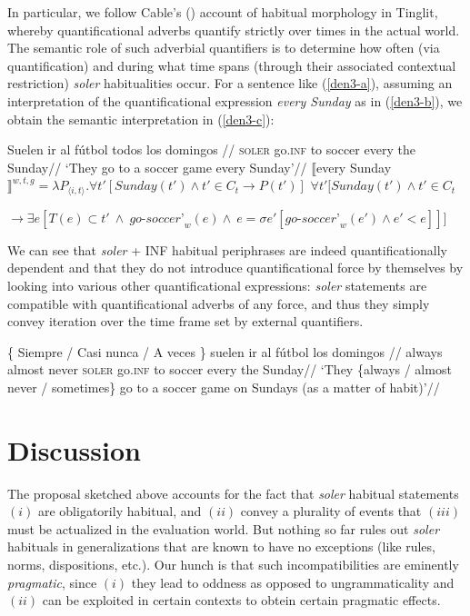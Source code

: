 \documentclass{cascadilla-xelatex-biblatex}
\begin{document}
	In particular, we follow Cable's (\cite{Cable:2022}) account of habitual morphology in Tinglit, whereby quantificational adverbs quantify strictly over times in the actual world. The semantic role of such adverbial quantifiers is to determine how often (via quantification) and during what time spans (through their associated contextual restriction) \textit{soler} habitualities occur. For a sentence like (\ref{den3-a}), assuming an interpretation of the quantificational expression \textit{every Sunday} as in (\ref{den3-b}), we obtain the semantic interpretation in (\ref{den3-c}):
	
	\pex\label{den3}
	\a\label{den3-a}\begingl
	\gla Suelen ir al f{\'u}tbol todos los domingos   //
	\glb \textsc{soler} go.\textsc{inf} to soccer every the Sunday//
	\glft `They go to a soccer game every Sunday'//
	\endgl
	\a\label{den3-b}$\llbracket$every Sunday$\rrbracket^{w,t,g} = \lambda P_{\langle i,t\rangle} . \forall t' [\textit{Sunday}(t') \wedge t' \in C_t \rightarrow P(t')]$
	\xe
	\ex\label{den3-c}$\forall t'[\textit{Sunday}(t') \wedge t' \in C_t$
	
	{}\hspace{1cm}$\rightarrow \exists e [ T(e) \subset t' \ \wedge \ \textit{go-soccer'}_w(e) \wedge \ e =  \sigma e'[\textit{go-soccer'}_w(e') \wedge e' < e]]]$
	\xe
	
	We can see that \textit{soler} + INF habitual periphrases are indeed quantificationally dependent and that they do not introduce quantificational force by themselves by looking into various other quantificational expressions: \textit{soler} statements are compatible with quantificational adverbs of any force, and thus they simply convey iteration over the time frame set by external quantifiers.
	
	\ex\label{den3-2}
	\begingl
	\gla \textnormal{\{} Siempre / Casi nunca / A veces \textnormal{\}} suelen ir al f{\'u}tbol los domingos   //
	\glb {} always {} almost never {} \textsc{soler} go.\textsc{inf} to soccer every the Sunday//
	\glft `They \{always / almost never / sometimes\} go to a soccer game on Sundays (as a matter of habit)'//
	\endgl
	\xe		
	
	\vspace{-\baselineskip}
	
	\section{Discussion}
	
	The proposal sketched above accounts for the fact that \textit{soler} habitual statements $(i)$ are obligatorily habitual, and $(ii)$ convey a plurality of events that $(iii)$ must be actualized in the evaluation world. But nothing so far rules out \textit{soler} habituals in generalizations that are known to have no exceptions (like rules, norms, dispositions, etc.). Our hunch is that such incompatibilities are eminently \textit{pragmatic}, since $(i)$ they lead to oddness as opposed to ungrammaticality and $(ii)$ can be exploited in certain contexts to obtein certain pragmatic effects.
	
\end{document}
